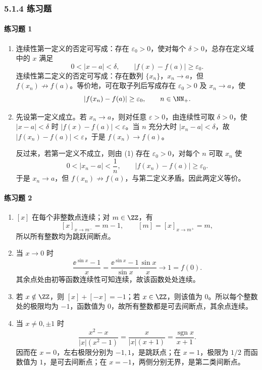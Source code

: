 \subsubsection*{5.1.4 练习题}

\paragraph{练习题 1}
\begin{xsolution}
\begin{enumerate}[label=(\arabic*)]
 \item 连续性第一定义的否定可写成：存在 $\varepsilon_0>0$，使对每个 $\delta>0$，总存在定义域中的 $x$ 满足
 \[
  0<|x-a|<\delta,\qquad |f(x)-f(a)|\ge\varepsilon_0.
 \]
 连续性第二定义的否定可写成：存在数列 $\{x_n\}$，$x_n\to a$，但 $f(x_n)\not\to f(a)$。等价地，可在取子列后写成存在 $\varepsilon_0>0$ 及 $x_n\to a$，使
 \[
  |f(x_n)-f(a)|\ge\varepsilon_0,\qquad n\in\NN_+.
 \]

 \item 先设第一定义成立。若 $x_n\to a$，则对任意 $\varepsilon>0$，由连续性可取 $\delta>0$，使 $|x-a|<\delta$ 时 $|f(x)-f(a)|<\varepsilon$。当 $n$ 充分大时 $|x_n-a|<\delta$，故 $|f(x_n)-f(a)|<\varepsilon$，于是 $f(x_n)\to f(a)$。

 反过来，若第一定义不成立，则由 (1) 存在 $\varepsilon_0>0$，对每个 $n$ 可取 $x_n$ 使
 \[
  0<|x_n-a|<\frac1n,
  \qquad |f(x_n)-f(a)|\ge\varepsilon_0.
 \]
 于是 $x_n\to a$，但 $f(x_n)\not\to f(a)$，与第二定义矛盾。因此两定义等价。
\end{enumerate}
\end{xsolution}

\paragraph{练习题 2}
\begin{xsolution}
\begin{enumerate}[label=(\arabic*)]
 \item $[x]$ 在每个非整数点连续；对 $m\in\ZZ$，有
 \[
  [x]_{x\to m^-}=m-1,\qquad [m]=[x]_{x\to m^+}=m,
 \]
 所以所有整数均为跳跃间断点。

 \item 当 $x\to0$ 时
 \[
  \frac{\ee^{\sin x}-1}{x}
  =\frac{\ee^{\sin x}-1}{\sin x}\frac{\sin x}{x}\longrightarrow1=f(0).
 \]
 其余点处由初等函数连续性可知连续，故该函数处处连续。

 \item 若 $x\notin\ZZ$，则 $[x]+[-x]=-1$；若 $x\in\ZZ$，则该值为 $0$。所以每个整数处的极限均为 $-1$，函数值为 $0$，故所有整数都是可去间断点，其余点连续。

 \item 当 $x\ne0,\pm1$ 时
 \[
  \frac{x^2-x}{|x|(x^2-1)}
  =\frac{x}{|x|(x+1)}
  =\frac{\operatorname{sgn}x}{x+1}.
 \]
 因而在 $x=0$，左右极限分别为 $-1,1$，是跳跃点；在 $x=1$，极限为 $1/2$ 而函数值为 $1$，是可去间断点；在 $x=-1$，两侧分别无界，是第二类间断点。
\end{enumerate}
\end{xsolution}

